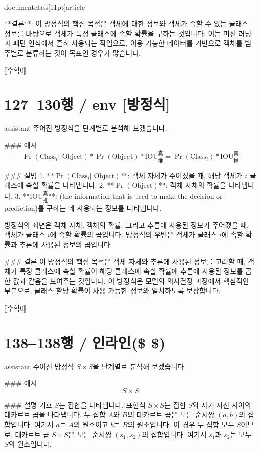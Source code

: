 \\documentclass[11pt]{article}
\begin{document}
**결론**: 이 방정식의 핵심 목적은 객체에 대한 정보와 객체가 속할 수 있는 클래스 정보를 바탕으로 객체가 특정 클래스에 속할 확률을 구하는 것입니다. 이는 머신 러닝과 패턴 인식에서 흔히 사용되는 작업으로, 이용 가능한 데이터를 기반으로 객체를 범주별로 분류하는 것이 목표인 경우가 많습니다.

⟦수학0⟧

\section*{127~130행 / env [방정식]}
assistant
주어진 방정식을 단계별로 분석해 보겠습니다.

### 예시
\[
\Pr(\textrm{Class}_i | \textrm{ Object}) * \Pr(\textrm{Object}) * \textrm{IOU}_{\textrm{推}}^{\textrm{真}} = \Pr(\textrm{Class}_i) * \textrm{IOU}_{\textrm{推}}^{\textrm{真}}
\]

### 설명
1. **\(\Pr(\textrm{Class}_i | \textrm{ Object})\)**: 객체 자체가 주어졌을 때, 해당 객체가 \(i\) 클래스에 속할 확률을 나타냅니다.
2. **\(\Pr(\textrm{Object})\)**: 객체 자체의 확률을 나타냅니다.
3. **\(\textrm{IOU}_{\textrm{推}}^{\textrm{真}}\)**: (the information that is used to make the decision or prediction)를 구하는 데 사용되는 정보를 나타냅니다.

방정식의 좌변은 객체 자체, 객체의 확률, 그리고 추론에 사용된 정보가 주어졌을 때, 객체가 클래스 \(i\)에 속할 확률의 곱입니다. 방정식의 우변은 객체가 클래스 \(i\)에 속할 확률과 추론에 사용된 정보의 곱입니다.

### 결론
이 방정식의 핵심 목적은 객체 자체와 추론에 사용된 정보를 고려할 때, 객체가 특정 클래스에 속할 확률이 해당 클래스에 속할 확률에 추론에 사용된 정보를 곱한 값과 같음을 보여주는 것입니다. 이 방정식은 모델의 의사결정 과정에서 핵심적인 부분으로, 클래스 할당 확률이 사용 가능한 정보와 일치하도록 보장합니다.

⟦수학0⟧

\section*{138–138행 / 인라인(\$ \$) }
assistant
주어진 방정식 \( S \times S \)을 단계별로 분석해 보겠습니다.

### 예시
\[ S \times S \]

### 설명
기호 \( S \)는 집합을 나타냅니다. 표현식 \( S \times S \)는 집합 \( S \)와 자기 자신 사이의 데카르트 곱을 나타냅니다. 두 집합 \( A \)와 \( B \)의 데카르트 곱은 모든 순서쌍 \((a, b)\)의 집합입니다. 여기서 \( a \)는 \( A \)의 원소이고 \( b \)는 \( B \)의 원소입니다. 이 경우 두 집합 모두 \( S \)이므로, 데카르트 곱 \( S \times S \)은 모든 순서쌍 \((s_1, s_2)\)의 집합입니다. 여기서 \( s_1 \)과 \( s_2 \)는 모두 \( S \)의 원소입니다.
\end{document}
